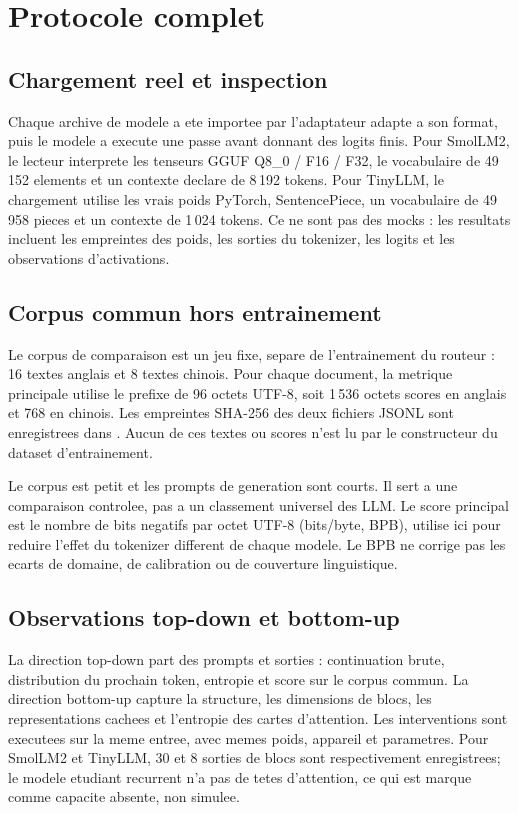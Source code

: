 \documentclass[11pt,a4paper]{article}
\newcommand{\code}[1]{\texttt{\detokenize{#1}}}
\begin{document}
\section{Protocole complet}
\subsection{Chargement reel et inspection}
Chaque archive de modele a ete importee par l'adaptateur adapte a son format, puis le modele a execute une passe avant donnant des logits finis. Pour SmolLM2, le lecteur interprete les tenseurs GGUF Q8\_0 / F16 / F32, le vocabulaire de 49\,152 elements et un contexte declare de 8\,192 tokens. Pour TinyLLM, le chargement utilise les vrais poids PyTorch, SentencePiece, un vocabulaire de 49\,958 pieces et un contexte de 1\,024 tokens. Ce ne sont pas des mocks : les resultats incluent les empreintes des poids, les sorties du tokenizer, les logits et les observations d'activations.

\subsection{Corpus commun hors entrainement}
Le corpus de comparaison est un jeu fixe, separe de l'entrainement du routeur : 16 textes anglais et 8 textes chinois. Pour chaque document, la metrique principale utilise le prefixe de 96 octets UTF-8, soit 1\,536 octets scores en anglais et 768 en chinois. Les empreintes SHA-256 des deux fichiers JSONL sont enregistrees dans \code{model_comparison_results.json}. Aucun de ces textes ou scores n'est lu par le constructeur du dataset d'entrainement.

Le corpus est petit et les prompts de generation sont courts. Il sert a une comparaison controlee, pas a un classement universel des LLM. Le score principal est le nombre de bits negatifs par octet UTF-8 (bits/byte, BPB), utilise ici pour reduire l'effet du tokenizer different de chaque modele. Le BPB ne corrige pas les ecarts de domaine, de calibration ou de couverture linguistique.

\subsection{Observations top-down et bottom-up}
La direction top-down part des prompts et sorties : continuation brute, distribution du prochain token, entropie et score sur le corpus commun. La direction bottom-up capture la structure, les dimensions de blocs, les representations cachees et l'entropie des cartes d'attention. Les interventions sont executees sur la meme entree, avec memes poids, appareil et parametres. Pour SmolLM2 et TinyLLM, 30 et 8 sorties de blocs sont respectivement enregistrees; le modele etudiant recurrent n'a pas de tetes d'attention, ce qui est marque comme capacite absente, non simulee.
\end{document}
